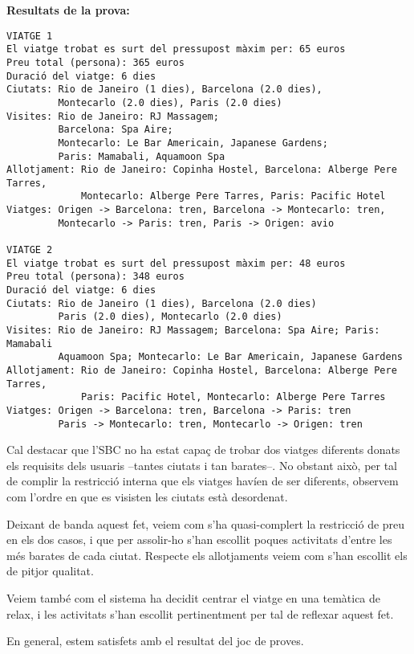 \documentclass[11pt,a4paper]{article}
\begin{document}
\textbf{Resultats de la prova:} 
\begin{lstlisting}
VIATGE 1
El viatge trobat es surt del pressupost màxim per: 65 euros
Preu total (persona): 365 euros
Duració del viatge: 6 dies
Ciutats: Rio de Janeiro (1 dies), Barcelona (2.0 dies),
         Montecarlo (2.0 dies), Paris (2.0 dies)
Visites: Rio de Janeiro: RJ Massagem; 
         Barcelona: Spa Aire; 
         Montecarlo: Le Bar Americain, Japanese Gardens; 
         Paris: Mamabali, Aquamoon Spa
Allotjament: Rio de Janeiro: Copinha Hostel, Barcelona: Alberge Pere Tarres,
             Montecarlo: Alberge Pere Tarres, Paris: Pacific Hotel
Viatges: Origen -> Barcelona: tren, Barcelona -> Montecarlo: tren, 
         Montecarlo -> Paris: tren, Paris -> Origen: avio

VIATGE 2
El viatge trobat es surt del pressupost màxim per: 48 euros
Preu total (persona): 348 euros
Duració del viatge: 6 dies
Ciutats: Rio de Janeiro (1 dies), Barcelona (2.0 dies)
         Paris (2.0 dies), Montecarlo (2.0 dies)
Visites: Rio de Janeiro: RJ Massagem; Barcelona: Spa Aire; Paris: Mamabali
         Aquamoon Spa; Montecarlo: Le Bar Americain, Japanese Gardens
Allotjament: Rio de Janeiro: Copinha Hostel, Barcelona: Alberge Pere Tarres, 
             Paris: Pacific Hotel, Montecarlo: Alberge Pere Tarres
Viatges: Origen -> Barcelona: tren, Barcelona -> Paris: tren
         Paris -> Montecarlo: tren, Montecarlo -> Origen: tren

\end{lstlisting} 

\medskip
Cal destacar que l'SBC no ha estat capaç de trobar dos viatges diferents donats els requisits dels usuaris --tantes ciutats i tan barates--. No obstant això, per tal de complir la restricció interna que els viatges havíen de ser diferents, observem com l'ordre en que es visisten les ciutats està desordenat. 

Deixant de banda aquest fet, veiem com s'ha quasi-complert la restricció de preu en els dos casos, i que per assolir-ho s'han escollit poques activitats d'entre les més barates de cada ciutat. Respecte els allotjaments veiem com s'han escollit els de pitjor qualitat.

Veiem també com el sistema ha decidit centrar el viatge en una temàtica de relax, i les activitats s'han escollit pertinentment per tal de reflexar aquest fet.

En general, estem satisfets amb el resultat del joc de proves.

\end{document}
